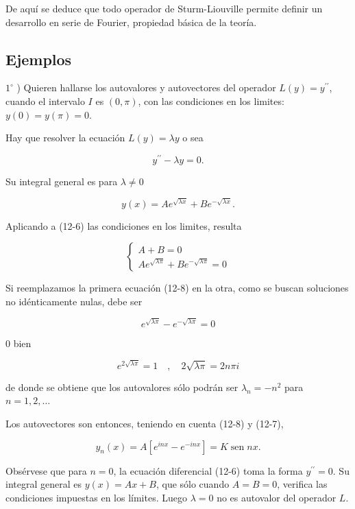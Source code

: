 \documentclass[10pt]{article}
\theoremstyle{plain}
\theoremstyle{definition}
\theoremstyle{remark}
\begin{document}
De aquí se deduce que todo operador de Sturm-Liouville permite definir un desarrollo en serie de Fourier, propiedad básica de la teoría.

\subsection{Ejemplos}
$1^{\circ}$ ) Quieren hallarse los autovalores y autovectores del operador $L(y)=y^{\prime \prime}$, cuando el intervalo $I$ es $(0, \pi)$, con las condiciones en los limites: $y(0)=y(\pi)=0$.

Hay que resolver la ecuación $L(y)=\lambda y$ o sea


\begin{equation*}
y^{\prime \prime}-\lambda y=0 . \tag{12-6}
\end{equation*}


Su integral general es para $\lambda \neq 0$


\begin{equation*}
y(x)=A e^{\sqrt{\lambda x}}+B e^{-\sqrt{\lambda x}} . \tag{12-7}
\end{equation*}


Aplicando a (12-6) las condiciones en los limites, resulta

\[
\left\{\begin{array}{l}
A+B=0  \tag{12-8}\\
A e^{\sqrt{\lambda \pi}}+B e^{-\sqrt{\lambda \pi}}=0
\end{array}\right.
\]

Si reemplazamos la primera ecuación (12-8) en la otra, como se buscan soluciones no idénticamente nulas, debe ser

$$
e^{\sqrt{\lambda \pi}}-e^{-\sqrt{\lambda \pi}}=0
$$

0 bien

$$
e^{2 \sqrt{\lambda \pi}}=1 \quad, \quad 2 \sqrt{\lambda \pi}=2 n \pi i
$$

de donde se obtiene que los autovalores sólo podrán ser $\lambda_{n}=-n^{2}$ para $n=1,2, \ldots$

Los autovectores son entonces, teniendo en cuenta (12-8) y (12-7),

$$
y_{n}(x)=A\left[e^{i n x}-e^{-i n x}\right]=K \operatorname{sen} n x .
$$

Obsérvese que para $n=0$, la ecuación diferencial (12-6) toma la forma $y^{\prime \prime}=0$. Su integral general es $y(x)=A x+B$, que sólo cuando $A=B=0$, verifica las condiciones impuestas en los límites. Luego $\lambda=0$ no es autovalor del operador $L$.
\end{document}
